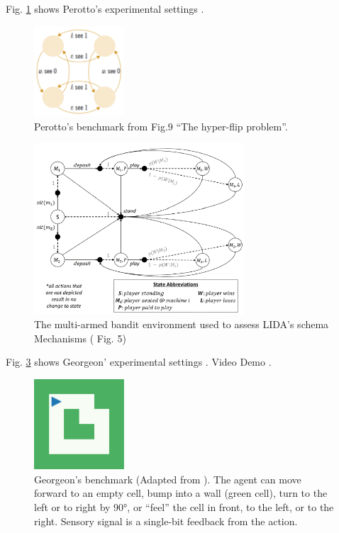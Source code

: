 \documentclass[runningheads]{llncs}
\begin{document}
Fig. \ref{fig:perotto_ben} shows Perotto's experimental settings \cite{perotto_computational_nodate}.


\begin{figure}
	\centering
	\includegraphics[width=0.3\textwidth]{Figure_perotto_benchmark.png}
	\caption{Perotto's benchmark from \cite{perotto_computational_nodate} Fig.9 ``The hyper-flip problem''.} 
	\label{fig:perotto_ben}
\end{figure}


\begin{figure}
	\centering
	\includegraphics[width=0.7\textwidth]{Figure_LIDA_bench.png}
	\caption{The multi-armed bandit environment used to assess LIDA's schema Mechanisms (\cite{kugele_constructivist_nodate} Fig. 5)} 
	\label{fig:lida_bench}
\end{figure}



Fig. \ref{fig:georgeon} shows Georgeon' experimental settings \cite{georgeon_intrinsically-motivated_2012}.
Video Demo \cite{georgeon_video_2012}.


\begin{figure}
	\centering
	\includegraphics[width=0.3\textwidth]{Figure_grid_plot.pdf}
	\caption{Georgeon's benchmark (Adapted from \cite{georgeon_intrinsically-motivated_2012}).
	The agent can move forward to an empty cell, bump into a wall (green cell), turn to the left or to right by 90°, or ``feel'' the cell in front, to the left, or to the right. 
	Sensory signal is a single-bit feedback from the action. 	
} 
	\label{fig:georgeon}
\end{figure}
\end{document}
